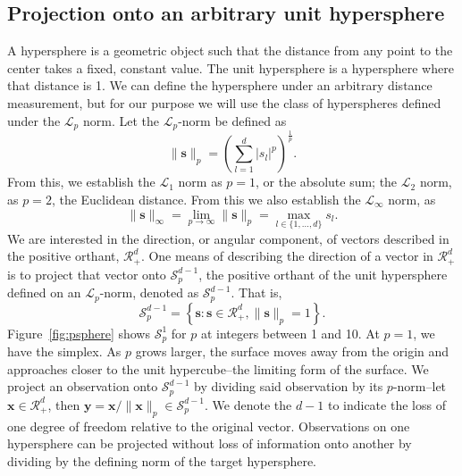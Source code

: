 \subsection{Projection onto an arbitrary unit hypersphere}
A hypersphere is a geometric object such that the distance from any point to the center takes a fixed,
  constant value.  The unit hypersphere is a hypersphere where that distance is 1. We can define the
  hypersphere under an arbitrary distance measurement, but for our purpose we will use the class of
  hyperspheres defined under the $\mathcal{L}_p$ norm. Let the $\mathcal{L}_p$-norm be defined as
  \begin{equation*}
    \lVert \bm{s} \rVert_p = \left({\textstyle\sum}_{l = 1}^d \lvert s_l\rvert^p\right)^{\frac{1}{p}}.
  \end{equation*}
  From this, we establish the $\mathcal{L}_1$ norm as $p = 1$, or the absolute sum; the
  $\mathcal{L}_2$ norm, as $p = 2$, the Euclidean distance.  From this we also establish the
  $\mathcal{L}_{\infty}$ norm, as
  \begin{equation*}
    \lVert \bm{s} \rVert_{\infty}
      = \lim\limits_{p\to\infty} \lVert \bm{s} \rVert_p
      = \max_{l\in\lbrace1,\ldots,d\rbrace}s_l.
  \end{equation*}
  We are interested in the direction, or angular component, of vectors described in the positive
  orthant, $\mathcal{R}_{+}^d$.  One means of describing the direction of a vector in $\mathcal{R}_+^d$
  is to project that vector onto $\mathcal{S}_{p}^{d-1}$, the positive orthant of the unit hypersphere
  defined on an $\mathcal{L}_p$-norm, denoted as $\mathcal{S}_{p}^{d-1}$.  That is,
  \begin{equation*}
    \mathcal{S}_{p}^{d-1} = \left\lbrace \bm{s} : \bm{s} \in \mathcal{R}_{+}^{d}, \lVert \bm{s}\rVert_{p} = 1\right\rbrace.
  \end{equation*}
  Figure~\ref{fig:psphere} shows $\mathcal{S}_{p}^{1}$ for $p$ at integers between 1 and 10.  At $p = 1$, we have the simplex.  As $p$ grows larger, the surface moves away from the origin and approaches closer to the unit hypercube--the limiting form of the surface. We project an observation onto $\mathcal{S}_p^{d-1}$ by dividing said observation by its $p$-norm--let  $\bm{x}\in \mathcal{R}_{+}^{d}$, then $\bm{y} = \bm{x} / \lVert \bm{x}\rVert_p \in \mathcal{S}_{p}^{d-1}$.
  We denote the $d-1$ to indicate the loss of one degree of freedom relative to the original vector.
  Observations on one hypersphere can be projected without loss of information onto another by
  dividing by the defining norm of the target hypersphere.
  
